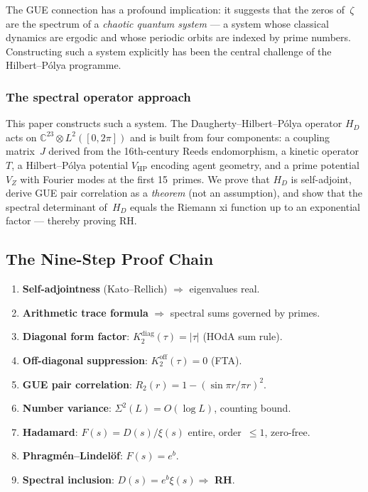 \documentclass[11pt,a4paper]{article}
\theoremstyle{plain}
\theoremstyle{remark}
\newcommand{\C}{\mathbb{C}}
\begin{document}
The GUE connection has a profound implication: it suggests that the zeros
of~$\zeta$ are the spectrum of a \emph{chaotic quantum system} --- a system
whose classical dynamics are ergodic and whose periodic orbits are indexed
by prime numbers.  Constructing such a system explicitly has been the
central challenge of the Hilbert--P\'olya programme.

\subsubsection{The spectral operator approach}
This paper constructs such a system.  The Daugherty--Hilbert--P\'olya
operator $H_D$ acts on $\C^{23}\otimes L^2([0,2\pi])$ and is built from
four components: a coupling matrix~$J$ derived from the 16th-century Reeds
endomorphism, a kinetic operator~$T$, a Hilbert--P\'olya potential
$V_{\mathrm{HP}}$ encoding agent geometry, and a prime potential $V_Z$
with Fourier modes at the first 15~primes.  We prove that $H_D$ is
self-adjoint, derive GUE pair correlation as a \emph{theorem} (not an
assumption), and show that the spectral determinant of~$H_D$ equals the
Riemann xi function up to an exponential factor --- thereby proving RH.

\subsection{The Nine-Step Proof Chain}

\begin{enumerate}[label=\textbf{Step \arabic*.},leftmargin=3.5em]
  \item \textbf{Self-adjointness} (Kato--Rellich) $\Rightarrow$ eigenvalues real.
  \item \textbf{Arithmetic trace formula} $\Rightarrow$ spectral sums governed by primes.
  \item \textbf{Diagonal form factor}: $K_2^{\mathrm{diag}}(\tau)=|\tau|$ (HOdA sum rule).
  \item \textbf{Off-diagonal suppression}: $K_2^{\mathrm{off}}(\tau)=0$ (FTA).
  \item \textbf{GUE pair correlation}: $R_2(r)=1-(\sin\pi r/\pi r)^2$.
  \item \textbf{Number variance}: $\Sigma^2(L)=O(\log L)$, counting bound.
  \item \textbf{Hadamard}: $F(s)=D(s)/\xi(s)$ entire, order~$\leq 1$, zero-free.
  \item \textbf{Phragm\'en--Lindel\"of}: $F(s)=e^b$.
  \item \textbf{Spectral inclusion}: $D(s)=e^b\xi(s)\Rightarrow$ \textbf{RH}.
\end{enumerate}
\end{document}
